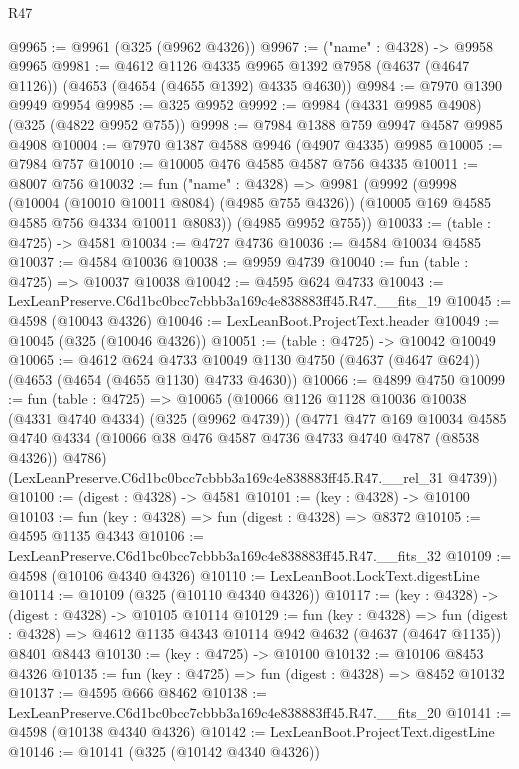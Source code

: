 \begin{lexlean}{R47}
\begin{coremodule}
@9965 := @9961 (@325 (@9962 @4326))
@9967 := ("name" : @4328) -> @9958 @9965
@9981 := @4612
    @1126
    @4335
    @9965
    @1392
    @7958
    (@4637 (@4647 @1126))
    (@4653 (@4654 (@4655 @1392) @4335 @4630))
@9984 := @7970 @1390 @9949 @9954
@9985 := @325 @9952
@9992 := @9984 (@4331 @9985 @4908) (@325 (@4822 @9952 @755))
@9998 := @7984 @1388 @759 @9947 @4587 @9985 @4908
@10004 := @7970 @1387 @4588 @9946 (@4907 @4335) @9985
@10005 := @7984 @757
@10010 := @10005 @476 @4585 @4587 @756 @4335
@10011 := @8007 @756
@10032 := fun ("name" : @4328) =>
  @9981
    (@9992
      (@9998
        (@10004 (@10010 @10011 @8084) (@4985 @755 @4326))
        (@10005 @169 @4585 @4585 @756 @4334 @10011 @8083))
      (@4985 @9952 @755))
@10033 := (table : @4725) -> @4581
@10034 := @4727 @4736
@10036 := @4584 @10034 @4585
@10037 := @4584 @10036
@10038 := @9959 @4739
@10040 := fun (table : @4725) => @10037 @10038
@10042 := @4595 @624 @4733
@10043 := LexLeanPreserve.C6d1bc0bcc7cbbb3a169c4e838883ff45.R47.__fits_19
@10045 := @4598 (@10043 @4326)
@10046 := LexLeanBoot.ProjectText.header
@10049 := @10045 (@325 (@10046 @4326))
@10051 := (table : @4725) -> @10042 @10049
@10065 := @4612
    @624
    @4733
    @10049
    @1130
    @4750
    (@4637 (@4647 @624))
    (@4653 (@4654 (@4655 @1130) @4733 @4630))
@10066 := @4899 @4750
@10099 := fun (table : @4725) =>
  @10065
    (@10066
      @1126
      @1128
      @10036
      @10038
      (@4331 @4740 @4334)
      (@325 (@9962 @4739))
      (@4771
        @477
        @169
        @10034
        @4585
        @4740
        @4334
        (@10066 @38 @476 @4587 @4736 @4733 @4740 @4787 (@8538 @4326))
        @4786)
      (LexLeanPreserve.C6d1bc0bcc7cbbb3a169c4e838883ff45.R47.__rel_31 @4739))
@10100 := (digest : @4328) -> @4581
@10101 := (key : @4328) -> @10100
@10103 := fun (key : @4328) => fun (digest : @4328) => @8372
@10105 := @4595 @1135 @4343
@10106 := LexLeanPreserve.C6d1bc0bcc7cbbb3a169c4e838883ff45.R47.__fits_32
@10109 := @4598 (@10106 @4340 @4326)
@10110 := LexLeanBoot.LockText.digestLine
@10114 := @10109 (@325 (@10110 @4340 @4326))
@10117 := (key : @4328) -> (digest : @4328) -> @10105 @10114
@10129 := fun (key : @4328) =>
  fun (digest : @4328) => @4612 @1135 @4343 @10114 @942 @4632 (@4637 (@4647 @1135)) @8401 @8443
@10130 := (key : @4725) -> @10100
@10132 := @10106 @8453 @4326
@10135 := fun (key : @4725) => fun (digest : @4328) => @8452 @10132
@10137 := @4595 @666 @8462
@10138 := LexLeanPreserve.C6d1bc0bcc7cbbb3a169c4e838883ff45.R47.__fits_20
@10141 := @4598 (@10138 @4340 @4326)
@10142 := LexLeanBoot.ProjectText.digestLine
@10146 := @10141 (@325 (@10142 @4340 @4326))

\end{coremodule}
\end{lexlean}
